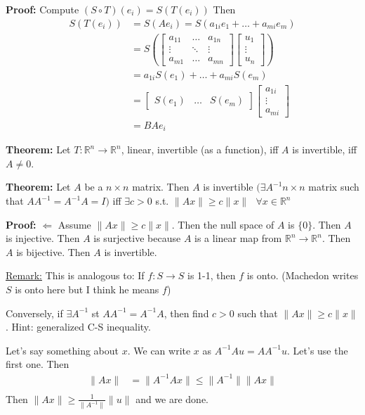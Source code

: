 \documentclass{article}
\newcommand*{\txt}[1]{\text{ #1 }}%
\newcommand*{\fora}{\txt{}\forall}%
\newcommand*{\rr}{\mathbb{R}}%
\begin{document}
\textbf{Proof:} Compute $(S\circ T)(e_i)=S(T(e_i))$ Then \begin{align*}
    S(T(e_i))&=S(Ae_i)=S(a_{1i}e_1+\dots+a_{mi}e_m)\\
    &=S(\begin{bmatrix}
        a_{11} & \dots & a_{1n}\\
        \vdots & \ddots & \vdots\\
        a_{m1} & \dots & a_{mn}
    \end{bmatrix}\begin{bmatrix}
        u_1\\
        \vdots\\
        u_n
    \end{bmatrix})\\
    &=a_{1i}S(e_1)+\dots+a_{mi}S(e_m)\\
    &=\begin{bmatrix}
        S(e_1) & \dots & S(e_m)
    \end{bmatrix} \begin{bmatrix}
        a_{1i}\\
        \vdots\\
        a_{mi}
    \end{bmatrix}\\
    &=BAe_i
\end{align*}

\textbf{Theorem:} Let $T:\rr^n\to\rr^n$, linear, invertible (as a function), iff $A$ is invertible, iff $A\neq 0$.

\textbf{Theorem:} Let $A$ be a $n\times n$ matrix. Then $A$ is invertible $(\exists A^{-1} n\times n$ matrix such that $AA^{-1}=A^{-1}A=I)$ iff $\exists c>0$ s.t. $\|Ax\|\geq c\|x\|\fora x\in \rr^n$

\textbf{Proof:} $\Leftarrow$ Assume $\|Ax\|\geq c\|x\|$. Then the null space of $A$ is $\{0\}$. Then $A$ is injective. Then $A$ is surjective because $A$ is a linear map from $\rr^n\to\rr^n$. Then $A$ is bijective. Then $A$ is invertible.

\underline{Remark:} This is analogous to: If $f:S\to S$ is 1-1, then $f$ is onto. (Machedon writes $S$ is onto here but I think he means $f$)

Conversely, if $\exists A^{-1}$ st $AA^{-1}=A^{-1}A$, then find $c>0$ such that $\|Ax\|\geq c\|x\|$. Hint: generalized C-S inequality.

Let's say something about $x$. We can write $x$ as $A^{-1}Au=AA^{-1}u$. Let's use the first one. Then \begin{align*}
    \|Ax\|&=\|A^{-1}Ax\|\leq \|A^{-1}\|\|Ax\|\\
\end{align*} Then $\|Ax\|\geq \frac{1}{\|A^{-1}\|}\|u\|$ and we are done.
\end{document}
